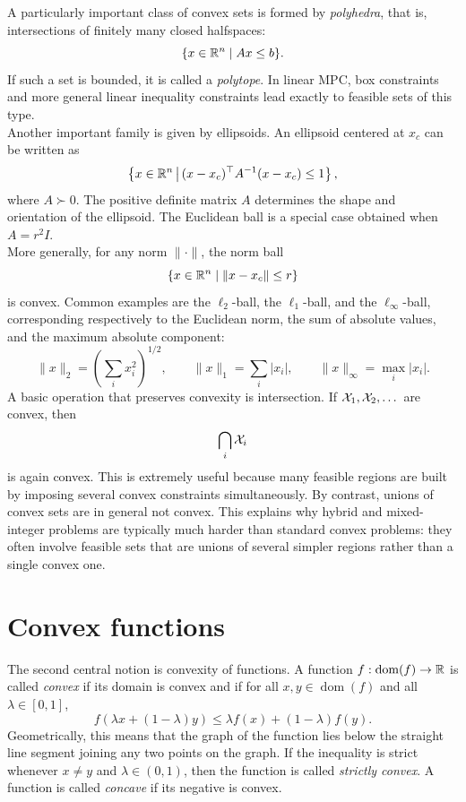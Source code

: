 A particularly important class of convex sets is formed by \emph{polyhedra}, that is, intersections of finitely many closed halfspaces:
\[
  \{x\in\mathbb{R}^n \mid Ax \le b\}.
\]
If such a set is bounded, it is called a \emph{polytope}. In linear MPC, box constraints and more general linear inequality constraints lead exactly to feasible sets of this type.\\

Another important family is given by ellipsoids. An ellipsoid centered at \(x_c\) can be written as
\[
\left\{x\in\mathbb{R}^n \,\middle|\, (x-x_c)^\top A^{-1}(x-x_c)\le 1\right\},
\]
where \(A\succ 0\). The positive definite matrix \(A\) determines the shape and orientation of the ellipsoid. The Euclidean ball is a special case obtained when \(A=r^2 I\).\\
More generally, for any norm \(\|\cdot\|\), the norm ball
\[
\{x\in\mathbb{R}^n \mid \|x-x_c\|\le r\}
\]
is convex. Common examples are the \(\ell_2\)-ball, the \(\ell_1\)-ball, and the \(\ell_\infty\)-ball, corresponding respectively to the Euclidean norm, the sum of absolute values, and the maximum absolute component:
\[
\|x\|_2 = \left(\sum_i x_i^2\right)^{1/2},\qquad
\|x\|_1 = \sum_i |x_i|,\qquad
\|x\|_\infty = \max_i |x_i|.
\]
A basic operation that preserves convexity is intersection. If \(\mathcal{X}_1,\mathcal{X}_2,\dots\) are convex, then
\[
\bigcap_i \mathcal{X}_i
\]
is again convex. This is extremely useful because many feasible regions are built by imposing several convex constraints simultaneously. By contrast, unions of convex sets are in general not convex. This explains why hybrid and mixed-integer problems are typically much harder than standard convex problems: they often involve feasible sets that are unions of several simpler regions rather than a single convex one.


\section{Convex functions}

The second central notion is convexity of functions. A function \(f:\operatorname{dom}(f)\to\mathbb{R}\) is called \emph{convex} if its domain is convex and if for all \(x,y\in\operatorname{dom}(f)\) and all \(\lambda\in[0,1]\),
\[
f(\lambda x + (1-\lambda)y)
\le
\lambda f(x) + (1-\lambda)f(y).
\]
Geometrically, this means that the graph of the function lies below the straight line segment joining any two points on the graph. If the inequality is strict whenever \(x\neq y\) and \(\lambda\in(0,1)\), then the function is called \emph{strictly convex}. A function is called \emph{concave} if its negative is convex.\\

